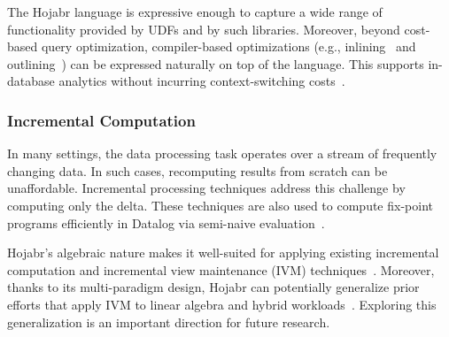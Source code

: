 \documentclass[sigconf,nonacm]{acmart}
\begin{document}
The Hojabr language is expressive enough to capture a wide range of functionality provided by UDFs and by such libraries. Moreover, beyond cost-based query optimization, compiler-based optimizations (e.g., inlining~\cite{shahrokhi2024pytond} and outlining~\cite{arch2024key}) can be expressed naturally on top of the language. This supports in-database analytics without incurring context-switching costs~\cite{fischer2022snakes}.

\subsubsection{Incremental Computation} In many settings, the data processing task operates over a stream of frequently changing data. In such cases, recomputing results from scratch can be unaffordable. Incremental processing techniques address this challenge by computing only the delta. These techniques are also used to compute fix-point programs efficiently in Datalog via semi-naive evaluation~\cite{abiteboul1995foundations}.

Hojabr’s algebraic nature makes it well-suited for applying existing incremental computation and incremental view maintenance (IVM) techniques~\cite{budiu2023dbsp,koch2014dbtoaster,murray2016incremental}. Moreover, thanks to its multi-paradigm design, Hojabr can potentially generalize prior efforts that apply IVM to linear algebra and hybrid workloads~\cite{nikolic2014linview,nikolic2018incremental,shaikhha2020synthesis}. Exploring this generalization is an important direction for future research.




\end{document}
